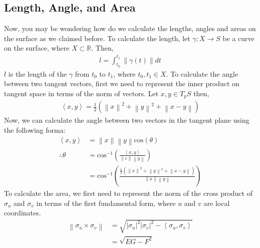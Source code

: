 \documentclass{article}
\theoremstyle{plain}
\theoremstyle{definition}
\theoremstyle{remark}
\newcommand{\R}{\mathbb{R}}
\begin{document}
\subsection{Length, Angle, and Area}
Now, you may be wondering how do we calculate the lengths, angles and areas on the surface as we claimed before. To calculate the length, let \( \gamma: X \rightarrow S \) be a curve on the surface, where \(X \subset \R \). Then,
\begin{align*}
    l = \int_{t_0}^{t_1} \left\lVert \gamma(t)\right\rVert dt
\end{align*}
\(l\) is the length of the \(\gamma\) from \(t_0\) to \(t_1\), where \( t_0, t_1 \in X\).
To calculate the angle between two tangent vectors, first we need to represent the inner product on tangent space in terms of the norm of vectors. Let \( x,y \in T_pS\) then,
\begin{align*}
    \left\langle x, y\right\rangle = \frac{1}{2}(\left\lVert x\right\rVert^2 + \left\lVert y\right\rVert^2 +\left\lVert x-y \right\rVert  )
\end{align*}
Now, we can calculate the angle between two vectors in the tangent plane using the following forma:
\begin{align*}
    \left\langle x,y\right\rangle & = \left\lVert x\right\rVert \left\lVert y\right\rVert \text{cos}(\theta)                                                                                                                              \\
    \therefore \theta             & = \text{cos}^{-1} \left( \frac{\left\langle x,y\right\rangle }{\left\lVert c\right\rVert \left\lVert y\right\rVert } \right)                                                                          \\
                                  & = \text{cos}^{-1} \left( \frac{\frac{1}{2}(\left\lVert x\right\rVert^2 + \left\lVert y\right\rVert^2 +\left\lVert x-y \right\rVert  ) }{\left\lVert x\right\rVert \left\lVert y\right\rVert } \right)
\end{align*}
To calculate the area, we first need to represent the norm of the cross product of \( \sigma_u \) and \( \sigma_v \) in terms of the first fundamental form, where \( u \) and \( v\) are local coordinates.
\begin{align*}
    \left\lVert \sigma_u \times \sigma_v \right\rVert & = \sqrt{\left\lvert \sigma_u\right\rvert^2 \left\lvert \sigma_v \right\rvert^2 - \left\langle \sigma_u, \sigma_v \right\rangle } \\
                                                      & = \sqrt{EG - F^2}
\end{align*}
\end{document}
